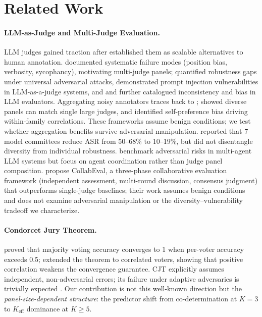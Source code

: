 \section{Related Work}

\paragraph{LLM-as-Judge and Multi-Judge Evaluation.}
LLM judges gained traction after \citet{zheng2023judging} established them as scalable alternatives to human annotation. \citet{wang2023fair} documented systematic failure modes (position bias, verbosity, sycophancy), motivating multi-judge panels; \citet{raina2024judgerobust} quantified robustness gaps under universal adversarial attacks, \citet{maloyan2025investigating} demonstrated prompt injection vulnerabilities in LLM-as-a-judge systems, and \citet{stureborg2024inconsistent} and \citet{ye2024justice} further catalogued inconsistency and bias in LLM evaluators. Aggregating noisy annotators traces back to \citet{dawid1979maximum}; \citet{verga2024replacing} showed diverse panels can match single large judges, and \citet{panickssery2024llm} identified self-preference bias driving within-family correlations. These frameworks assume benign conditions; we test whether aggregation benefits survive adversarial manipulation. \citet{almasoud2026security} reported that 7-model committees reduce ASR from 50--68\% to 10--19\%, but did not disentangle diversity from individual robustness. \citet{tamas2025benchmarking} benchmark adversarial risks in multi-agent LLM systems but focus on agent coordination rather than judge panel composition. \citet{qian2026collabeval} propose CollabEval, a three-phase collaborative evaluation framework (independent assessment, multi-round discussion, consensus judgment) that outperforms single-judge baselines; their work assumes benign conditions and does not examine adversarial manipulation or the diversity--vulnerability tradeoff we characterize.

\paragraph{Condorcet Jury Theorem.}
\citet{condorcet1785essai} proved that majority voting accuracy converges to 1 when per-voter accuracy exceeds 0.5; \citet{ladha1992condorcet} extended the theorem to correlated voters, showing that positive correlation weakens the convergence guarantee. CJT explicitly assumes independent, non-adversarial errors; its failure under adaptive adversaries is trivially expected \citep{tramer2018ensemble,kariyappa2019improving,pang2019improving}. Our contribution is not this well-known direction but the \emph{panel-size-dependent structure}: the predictor shift from co-determination at $K{=}3$ to $K_{\mathrm{eff}}$ dominance at $K{\geq}5$.

